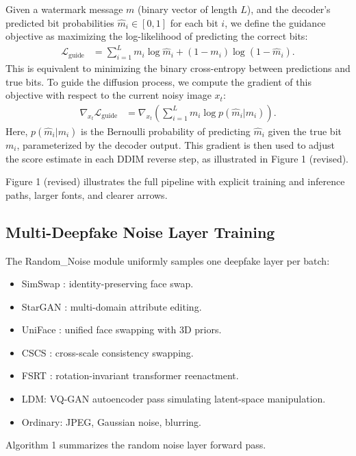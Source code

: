 \documentclass{article}
\begin{document}
Given a watermark message $m$ (binary vector of length $L$), and the decoder's predicted bit probabilities $\hat{m}_i \in [0,1]$ for each bit $i$, we define the guidance objective as maximizing the log-likelihood of predicting the correct bits:
\begin{align}
\mathcal{L}_{\text{guide}} &= \sum_{i=1}^L m_i \log \hat{m}_i + (1-m_i) \log (1-\hat{m}_i).
\end{align}
This is equivalent to minimizing the binary cross-entropy between predictions and true bits. To guide the diffusion process, we compute the gradient of this objective with respect to the current noisy image $x_t$:
\begin{align}
\nabla_{x_t} \mathcal{L}_{\text{guide}} &= \nabla_{x_t} \left( \sum_{i=1}^L m_i \log p(\hat{m}_i | m_i) \right).
\end{align}
Here, $p(\hat{m}_i | m_i)$ is the Bernoulli probability of predicting $\hat{m}_i$ given the true bit $m_i$, parameterized by the decoder output. This gradient is then used to adjust the score estimate in each DDIM reverse step, as illustrated in Figure 1 (revised).

Figure 1 (revised) illustrates the full pipeline with explicit training and inference paths, larger fonts, and clearer arrows.

\subsection{Multi-Deepfake Noise Layer Training}
The Random\_Noise module uniformly samples one deepfake layer per batch:
\begin{itemize}
\item SimSwap \cite{chen2020simswap}: identity-preserving face swap.
\item StarGAN \cite{choi2018stargan}: multi-domain attribute editing.
\item UniFace \cite{zhou2022uniface}: unified face swapping with 3D priors.
\item CSCS \cite{liu2023cscs}: cross-scale consistency swapping.
\item FSRT \cite{rochow2023fsrt}: rotation-invariant transformer reenactment.
\item LDM: VQ-GAN autoencoder pass simulating latent-space manipulation.
\item Ordinary: JPEG, Gaussian noise, blurring.
\end{itemize}

Algorithm 1 summarizes the random noise layer forward pass.
\end{document}
